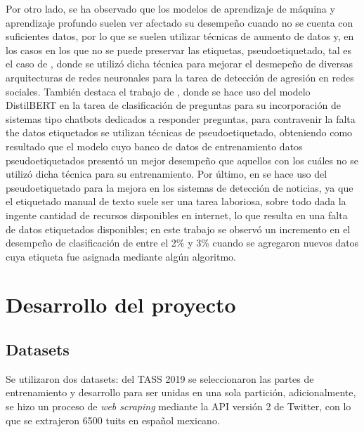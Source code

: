 \documentclass[a4paper]{llncs}
\begin{document}
Por otro lado, se ha observado que los modelos de aprendizaje de máquina y
aprendizaje profundo suelen ver afectado su desempeño cuando no se cuenta con
suficientes datos, por lo que se suelen utilizar técnicas de aumento de datos y,
en los casos en los que no se puede preservar las etiquetas, pseudoetiquetado,
tal es el caso de \cite{gelbukh-2018-aggression}, donde se utilizó dicha técnica
para mejorar el desmepeño de diversas arquitecturas de redes neuronales para la
tarea de detección de agresión en redes sociales. También destaca el trabajo de
\cite{pseudoetiquedato_transformers}, donde se hace uso del modelo DistilBERT en
la tarea de clasificación de preguntas para su incorporación de sistemas tipo
chatbots dedicados a responder preguntas, para contravenir la falta the datos
etiquetados se utilizan técnicas de pseudoetiquetado, obteniendo como resultado
que el modelo cuyo banco de datos de entrenamiento datos pseudoetiquetados
presentó un mejor desempeño que aquellos con los cuáles no se utilizó dicha
técnica para su entrenamiento. Por último, en \cite{blue} se hace uso del
pseudoetiquetado para la mejora en los sistemas de detección de noticias, ya que
el etiquetado manual de texto suele ser una tarea laboriosa, sobre todo dada la
ingente cantidad de recursos disponibles en internet, lo que resulta en una
falta de datos etiquetados disponibles; en este trabajo se observó un incremento
en el desempeño de clasificación de entre el 2\% y 3\% cuando se agregaron nuevos
datos cuya etiqueta fue asignada mediante algún algoritmo.



\section{Desarrollo del proyecto}
\label{sec:orgf2dbb9a}
\subsection{Datasets}
\label{sec:org78df381}
Se utilizaron dos datasets: del TASS 2019 se seleccionaron las partes de
entrenamiento y desarrollo para  ser unidas en una sola partición,
adicionalmente, se hizo un proceso de \emph{web scraping} mediante la API versión 2
de Twitter, con lo que se extrajeron 6500 tuits en español mexicano.
\end{document}
